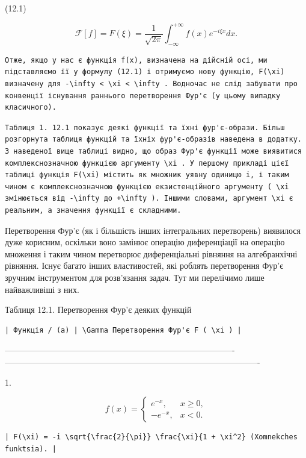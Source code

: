 \documentclass[
  ukrainian,
]{article}
\begin{document}
(12.1)

\[
\mathcal{F}[f] = F(\xi) = \frac{1}{\sqrt{2\pi}} \int_{-\infty}^{+\infty} f(x) e^{-i\xi x} dx.
\]

\begin{verbatim}
Отже, якщо у нас є функція f(x), визначена на дійсній осі, ми підставляємо її у формулу (12.1) і отримуємо нову функцію, F(\xi) визначену для -\infty < \xi < \infty . Водночас не слід забувати про конвенції існування раннього перетворення Фур'є (у цьому випадку класичного).
\end{verbatim}

\begin{verbatim}
Таблиця 1. 12.1 показує деякі функції та їхні фур'є-образи. Більш розгорнута таблиця функцій та їхніх фур'є-образів наведена в додатку. З наведеної вище таблиці видно, що образ Фур'є функції може виявитися комплекснозначною функцією аргументу \xi . У першому прикладі цієї таблиці функція F(\xi) містить як множник уявну одиницю i, і таким чином є комплекснозначною функцією екзистенційного аргументу ( \xi змінюється від -\infty до +\infty ). Іншими словами, аргумент \xi є реальним, а значення функції є складними.
\end{verbatim}

Перетворення Фур'є (як і більшість інших інтегральних перетворень)
виявилося дуже корисним, оскільки воно замінює операцію диференціації на
операцію множення і таким чином перетворює диференціальні рівняння на
алгебранхічні рівняння. Існує багато інших властивостей, які роблять
перетворення Фур'є зручним інструментом для розв'язання задач. Тут ми
перелічимо лише найважливіші з них.

Таблиця 12.1. Перетворення Фур'є деяких функцій

\begin{verbatim}
| Функція / (a) | \Gamma Перетворення Фур'є F ( \xi ) |
\end{verbatim}

\textbar----------------------------------------------------------------------------------\textbar-------------------------------------------------------------------------------------------\textbar{}

1.

\[
f(x) = \begin{cases} e^{-x}, & x \ge 0, \\ -e^{-x}, & x < 0. \end{cases}
\]

\begin{verbatim}
| F(\xi) = -i \sqrt{\frac{2}{\pi}} \frac{\xi}{1 + \xi^2} (Xomnekches funktsia). |
\end{verbatim}
\end{document}
